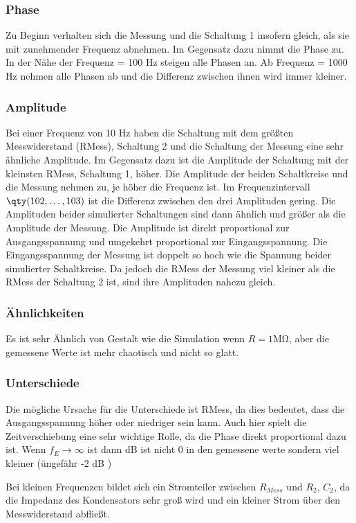 %
%
\subsubsection{Phase}
Zu Beginn verhalten sich die Messung und die Schaltung 1 insofern gleich, als sie mit zunehmender Frequenz abnehmen. Im Gegensatz dazu nimmt die Phase zu. In der Nähe der Frequenz = 100 Hz steigen alle Phasen an. Ab Frequenz = 1000 Hz nehmen alle Phasen ab und die Differenz zwischen ihnen wird immer kleiner.

\subsubsection{Amplitude}
Bei einer Frequenz von 10 Hz haben die Schaltung mit dem größten Messwiderstand (RMess), Schaltung 2 und die Schaltung der Messung eine sehr ähnliche Amplitude. Im Gegensatz dazu ist die Amplitude der Schaltung mit der kleinsten RMess, Schaltung 1, höher. Die Amplitude der beiden Schaltkreise und die Messung nehmen zu, je höher die Frequenz ist. Im Frequenzintervall $\qty(102,\dots,103)$ ist die Differenz zwischen den drei Amplituden gering. Die Amplituden beider simulierter Schaltungen sind dann ähnlich und größer als die Amplitude der Messung. Die Amplitude ist direkt proportional zur Ausgangsspannung und umgekehrt proportional zur Eingangsspannung. Die Eingangsspannung der Messung ist doppelt so hoch wie die Spannung beider simulierter Schaltkreise. Da jedoch die RMess der Messung viel kleiner als die RMess der Schaltung 2 ist, sind ihre Amplituden nahezu gleich.

\subsubsection{Ähnlichkeiten}
Es ist sehr Ähnlich von Gestalt wie die Simulation wenn $R=1 \si{\mega\ohm}$, aber die gemessene Werte ist mehr chaotisch und nicht so glatt. 


\subsubsection{Unterschiede}
Die mögliche Ursache für die Unterschiede ist RMess, da dies bedeutet, dass die Ausgangsspannung höher oder niedriger sein kann. Auch hier spielt die Zeitverschiebung eine sehr wichtige Rolle, da die Phase direkt proportional dazu ist. Wenn 
$f_E\rightarrow\infty$ ist dann dB ist nicht 0 in den gemessene werte sondern viel kleiner (üngefähr -2 dB  )
%

%
Bei kleinen Frequenzen bildet sich ein Stromteiler zwischen $R_{Mess}$ und $R_2$, $C_2$, da die Impedanz des Kondensators sehr groß wird und ein kleiner Strom über den Messwiderstand abfließt. 
%
\begin{flushright}
  \textit{\autorA}
\end{flushright}
%
%
%
%